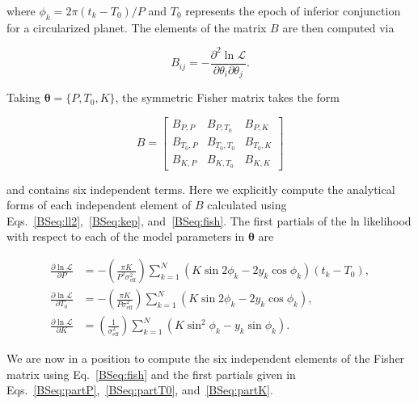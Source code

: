 \noindent where $\phi_k = 2\pi (t_k-T_0) / P$ and $T_0$ represents the epoch of inferior
conjunction for a circularized planet. The elements of the matrix $B$ are then computed via

\begin{equation}
  B_{ij} = -\frac{\partial^2 \ln{\mathcal{L}}}{\partial \theta_i \partial \theta_j}.
  \label{BSeq:fish}
\end{equation}

\noindent Taking $\boldsymbol{\theta}=\{P,T_0,K\}$, the symmetric Fisher matrix takes the
form

\begin{equation}
  B =
 \begin{bmatrix}
   B_{P,P} & B_{P,T_0} & B_{P,K} \\
   B_{T_0,P} & B_{T_0,T_0} & B_{T_0,K} \\
   B_{K,P} & B_{K,T_0} & B_{K,K} 
 \end{bmatrix} \label{BSeq:B}
\end{equation}

\noindent and contains six independent terms.
Here we explicitly compute the analytical forms of each independent element of $B$
calculated using Eqs.~\ref{BSeq:ll2},~\ref{BSeq:kep}, and~\ref{BSeq:fish}. The first partials
of the ln likelihood with respect to each of the model parameters in $\boldsymbol{\theta}$ are

\begin{align}
  \frac{\partial \ln{\mathcal{L}}}{\partial P} &=
  -\left( \frac{\pi K}{P^2 \sigma_{\text{eff}}^2} \right) \sum_{k=1}^{N} (K \sin{2\phi_k} - 2y_k \cos{\phi_k}) (t_k-T_0), \label{BSeq:partP} \\
  \frac{\partial \ln{\mathcal{L}}}{\partial T_0} &=
  -\left( \frac{\pi K}{P \sigma_{\text{eff}}^2} \right) \sum_{k=1}^{N} (K \sin{2\phi_k} - 2y_k \cos{\phi_k}), \label{BSeq:partT0} \\
  \frac{\partial \ln{\mathcal{L}}}{\partial K} &=
  \left( \frac{1}{\sigma_{\text{eff}}^2} \right) \sum_{k=1}^{N} \left( K\sin^2{\phi_k} - y_k\sin{\phi_k}  \right). \label{BSeq:partK}
\end{align}

\noindent We are now in a position to compute the six independent elements of the Fisher matrix using Eq.~\ref{BSeq:fish}
and the first partials given in Eqs.~\ref{BSeq:partP},~\ref{BSeq:partT0}, and~\ref{BSeq:partK}.


